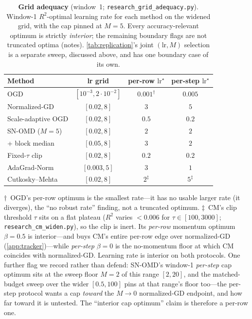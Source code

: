 \documentclass{article}
\begin{document}
\begin{table}[t]
\caption{\textbf{Grid adequacy} (window~1; \texttt{research\_grid\_adequacy.py}). Window-1
$R^2$-optimal learning rate for each method on the widened grid, with the cap pinned at
$M{=}5$. Every accuracy-relevant optimum is strictly \emph{interior}; the remaining boundary
flags are not truncated optima (notes). \cref{tab:replication}'s joint $(\mathrm{lr},M)$
selection is a separate sweep, discussed above, and has one boundary case of its own.}
\label{tab:grid}
\centering
\begin{small}
\begin{tabular}{lccc}
\toprule
Method & lr grid & per-row $\mathrm{lr}^\star$ & per-step $\mathrm{lr}^\star$ \\
\midrule
OGD                    & $[10^{-3},2{\cdot}10^{-2}]$ & $0.001^\dagger$ & $0.005$ \\
Normalized-GD          & $[0.02,8]$   & $3$   & $5$ \\
Scale-adaptive OGD     & $[0.02,8]$   & $0.5$ & $0.2$ \\
SN-OMD ($M{=}5$)       & $[0.02,8]$   & $2$   & $2$ \\
\quad + block median   & $[0.05,8]$   & $3$   & $2$ \\
Fixed-$\tau$ clip      & $[0.02,8]$   & $0.2$ & $0.2$ \\
AdaGrad-Norm           & $[0.003,5]$  & $3$   & $1$ \\
Cutkosky--Mehta        & $[0.02,8]$   & $2^\ddagger$ & $5^\ddagger$ \\
\bottomrule
\end{tabular}
\end{small}

\smallskip
{\footnotesize $\dagger$~OGD's per-row optimum is the smallest rate---it has no usable larger
rate (it diverges), the ``no robust rate'' finding, not a truncated optimum. $\ddagger$~CM's
clip threshold $\tau$ sits on a flat plateau ($R^2$ varies ${<}0.006$ for $\tau\in[100,3000]$;
\texttt{research\_cm\_widen.py}), so the clip is inert. Its \emph{per-row} momentum optimum
$\beta{=}0.5$ is interior---and buys CM's entire per-row edge over normalized-GD
(\cref{app:tracker})---while \emph{per-step} $\beta{=}0$ is the no-momentum floor at which CM
coincides with normalized-GD. Learning rate is interior on both protocols. One further flag we
record rather than defend: SN-OMD's window-1 \emph{per-step} cap optimum sits at the sweep floor
$M{=}2$ of this range $[2,20]$, and the matched-budget sweep over the wider $[0.5,100]$ pins at
that range's floor too---the per-step protocol wants a cap \emph{toward} the $M\!\to\!0$
normalized-GD endpoint, and how far toward it is untested. The ``interior cap optimum'' claim is
therefore a per-row one.}
\end{table}
\end{document}
